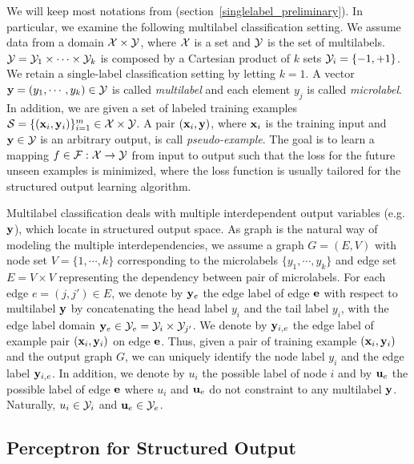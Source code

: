 {We will keep most notations from (section~\ref{singlelabel_preliminary}).
In particular, we examine the following multilabel classification setting.
We assume data from a domain $\mathcal{X}\times\mathcal{Y}$, where $\mathcal{X}$ is a set and $\mathcal{Y}$ is the set of multilabels.
$\mathcal{Y} = \mathcal{Y}_1\times\cdots\times\mathcal{Y}_k$ is composed by a Cartesian product of $k$ sets $\mathcal{Y}_i=\{-1,+1\}$.
We retain a single-label classification setting by letting $k=1$.
A vector $\mathbf {y}=(y_1,\cdots,y_k)\in\mathcal{Y}$ is called \textit{multilabel} and each element $y_j$ is called \textit{microlabel}.
In addition, we are given a set of labeled training examples $\mathcal{S}=\{(\mathbf {x}_i,\mathbf {y}_i)\}_{i=1}^{m}\in\mathcal{X}\times\mathcal{Y}$. 
A pair $(\mathbf {x}_i,\mathbf {y})$, where $\mathbf {x}_i$ is the training input and $\mathbf {y}\in\mathcal{Y}$ is an arbitrary output, is call \textit{pseudo-example}.
The goal is to learn a mapping $f\in\mathcal{F}:\mathcal{X}\rightarrow\mathcal{Y}$ from input to output such that the loss for the future unseen examples is minimized, where the loss function is usually tailored for the structured output learning algorithm.

Multilabel classification deals with multiple interdependent output variables (e.g. $\mathbf {y}$), which locate in structured output space.
As graph is the natural way of modeling the multiple interdependencies, we assume a graph $G=(E,V)$ with node set $V=\{1,\cdots,k\}$ corresponding to the microlabels $\{y_1,\cdots,y_k\}$ and edge set $E=V\times V$ representing the dependency between pair of microlabels.
For each edge $e=(j,j')\in E$, we denote by $\mathbf {y}_e$ the edge label of edge $\mathbf {e}$ with respect to multilabel $\mathbf {y}$ by concatenating the head label $y_i$ and the tail label $y_i$, with the edge label domain $\mathbf {y}_e\in\mathcal{Y}_e=\mathcal{Y}_i\times\mathcal{Y}_{j'}$.
We denote by $\mathbf {y}_{i,e}$ the edge label of example pair $(\mathbf {x}_i,\mathbf {y}_i)$ on edge $\mathbf {e}$.
Thus, given a pair of training example $(\mathbf {x}_i,\mathbf {y}_i)$ and the output graph $G$, we can uniquely identify the node label $y_i$ and the edge label $\mathbf {y}_{i,e}$.
In addition, we denote by $u_i$ the possible label of node $i$ and by $\mathbf {u}_{e}$ the possible label of edge $\mathbf {e}$ where $u_i$ and $\mathbf {u}_{e}$ do not constraint to any multilabel $\mathbf {y}$.
Naturally, $u_i\in\mathcal{Y}_i$ and $\mathbf {u}_e\in\mathcal{Y}_e$.


%


%
\subsection{Perceptron for Structured Output}

}
